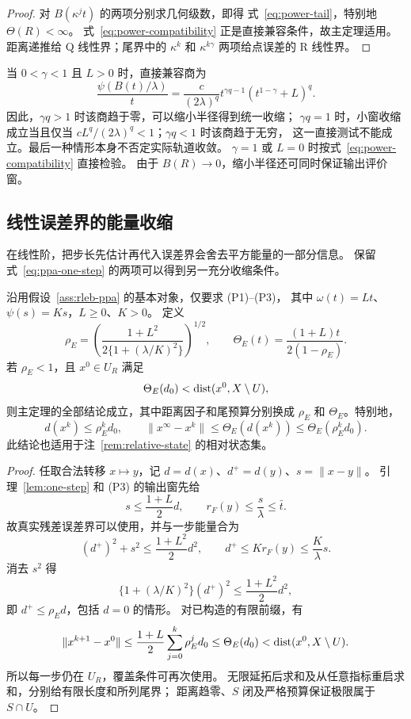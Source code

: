 \begin{proof}
对 $B(\kappa^jt)$ 的两项分别求几何级数，即得
式~\eqref{eq:power-tail}，特别地 $\Theta(R)<\infty$。
式~\eqref{eq:power-compatibility} 正是直接兼容条件，故主定理适用。
距离递推给 Q 线性界；尾界中的 $\kappa^k$ 和 $\kappa^{k\gamma}$
两项给点误差的 R 线性界。
\end{proof}

当 $0<\gamma<1$ 且 $L>0$ 时，直接兼容商为
\begin{equation}
\label{eq:power-critical-ratio}
 \frac{\psi(B(t)/\lambda)}t
 =\frac{c}{(2\lambda)^q}
 t^{\gamma q-1}(t^{1-\gamma}+L)^q.
\end{equation}
因此，$\gamma q>1$ 时该商趋于零，可以缩小半径得到统一收缩；
$\gamma q=1$ 时，小窗收缩成立当且仅当
$cL^q/(2\lambda)^q<1$；$\gamma q<1$ 时该商趋于无穷，
这一直接测试不能成立。最后一种情形本身不否定实际轨道收敛。
$\gamma=1$ 或 $L=0$ 时按式~\eqref{eq:power-compatibility} 直接检验。
由于 $B(R)\to0$，缩小半径还可同时保证输出评价窗。

\subsection{线性误差界的能量收缩}

在线性阶，把步长先估计再代入误差界会舍去平方能量的一部分信息。
保留式~\eqref{eq:ppa-one-step} 的两项可以得到另一充分收缩条件。

\begin{corollary}[线性能量收缩]
\label{cor:linear-energy-convergence}
沿用假设~\ref{ass:rleb-ppa} 的基本对象，仅要求 (P1)--(P3)，
其中 $\omega(t)=Lt$、$\psi(s)=Ks$，$L\ge0$、$K>0$。
定义
\begin{equation}
\label{eq:linear-energy-factor}
 \rho_E=\left(\frac{1+L^2}{2\{1+(\lambda/K)^2\}}\right)^{1/2},
 \qquad \Theta_E(t)=\frac{(1+L)t}{2(1-\rho_E)}.
\end{equation}
若 $\rho_E<1$，且 $x^0\in U_R$ 满足
\begin{equation}
\label{eq:linear-energy-budget}
 \Theta_E(d_0)<\operatorname{dist}(x^0,X\setminus U),
\end{equation}
则主定理的全部结论成立，其中距离因子和尾预算分别换成
$\rho_E$ 和 $\Theta_E$。特别地，
\[
 d(x^k)\le\rho_E^kd_0,\qquad
 \|x^\infty-x^k\|\le\Theta_E(d(x^k))\le\Theta_E(\rho_E^kd_0).
\]
此结论也适用于注~\ref{rem:relative-state} 的相对状态集。
\end{corollary}

\begin{proof}
任取合法转移 $x\mapsto y$，记 $d=d(x)$、$d^+=d(y)$、$s=\|x-y\|$。
引理~\ref{lem:one-step} 和 (P3) 的输出窗先给
\[
 s\le\frac{1+L}{2}d,\qquad
 r_F(y)\le\frac{s}\lambda\le\bar t.
\]
故真实残差误差界可以使用，并与一步能量合为
\[
 (d^+)^2+s^2\le\frac{1+L^2}{2}d^2,
 \qquad d^+\le K r_F(y)\le\frac K\lambda s.
\]
消去 $s^2$ 得
\[
 \{1+(\lambda/K)^2\}(d^+)^2\le\frac{1+L^2}{2}d^2,
\]
即 $d^+\le\rho_Ed$，包括 $d=0$ 的情形。
对已构造的有限前缀，有
\[
 \|x^{k+1}-x^0\|
 \le\frac{1+L}{2}\sum_{j=0}^{k}\rho_E^jd_0
 \le\Theta_E(d_0)<\operatorname{dist}(x^0,X\setminus U).
\]
所以每一步仍在 $U_R$，覆盖条件可再次使用。
无限延拓后求和及从任意指标重启求和，分别给有限长度和所列尾界；
距离趋零、$S$ 闭及严格预算保证极限属于 $S\cap U$。
\end{proof}

